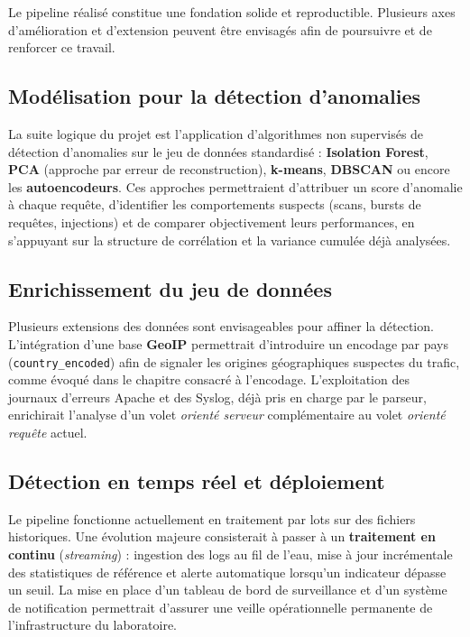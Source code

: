\documentclass[a4paper,12pt]{article}
\begin{document}
Le pipeline réalisé constitue une fondation solide et reproductible. Plusieurs axes d'amélioration et d'extension peuvent être envisagés afin de poursuivre et de renforcer ce travail.

\subsection*{Modélisation pour la détection d'anomalies}

La suite logique du projet est l'application d'algorithmes non supervisés de détection d'anomalies sur le jeu de données standardisé : \textbf{Isolation Forest}, \textbf{PCA} (approche par erreur de reconstruction), \textbf{k-means}, \textbf{DBSCAN} ou encore les \textbf{autoencodeurs}. Ces approches permettraient d'attribuer un score d'anomalie à chaque requête, d'identifier les comportements suspects (scans, bursts de requêtes, injections) et de comparer objectivement leurs performances, en s'appuyant sur la structure de corrélation et la variance cumulée déjà analysées.

\subsection*{Enrichissement du jeu de données}

Plusieurs extensions des données sont envisageables pour affiner la détection. L'intégration d'une base \textbf{GeoIP} permettrait d'introduire un encodage par pays (\texttt{country\_encoded}) afin de signaler les origines géographiques suspectes du trafic, comme évoqué dans le chapitre consacré à l'encodage. L'exploitation des journaux d'erreurs Apache et des Syslog, déjà pris en charge par le parseur, enrichirait l'analyse d'un volet \emph{orienté serveur} complémentaire au volet \emph{orienté requête} actuel.

\subsection*{Détection en temps réel et déploiement}

Le pipeline fonctionne actuellement en traitement par lots sur des fichiers historiques. Une évolution majeure consisterait à passer à un \textbf{traitement en continu} (\emph{streaming}) : ingestion des logs au fil de l'eau, mise à jour incrémentale des statistiques de référence et alerte automatique lorsqu'un indicateur dépasse un seuil. La mise en place d'un tableau de bord de surveillance et d'un système de notification permettrait d'assurer une veille opérationnelle permanente de l'infrastructure du laboratoire.
\end{document}
